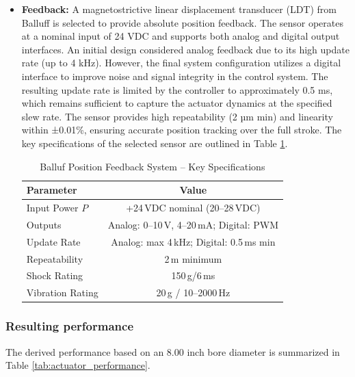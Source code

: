 \documentclass[
bindingoffset=5mm,  %
footnoteindent=3mm, %
hyphenation=true    %
]{src/wut-thesis}
\begin{document}
\begin{itemize}
		\item \textbf{Feedback:} A magnetostrictive linear displacement transducer (LDT) from Balluff is selected to provide absolute position feedback. The sensor operates at a nominal input of 24 VDC and supports both analog and digital output interfaces.
		An initial design considered analog feedback due to its high update rate (up to 4 kHz). However, the final system configuration utilizes a digital interface to improve noise and signal integrity in the control system. The resulting update rate is limited by the controller to approximately 0.5 ms, which remains sufficient to capture the actuator dynamics at the specified slew rate.
		The sensor provides high repeatability (2 µm min) and linearity within ±0.01\%, ensuring accurate position tracking over the full stroke. The key specifications of the selected sensor are outlined in Table \ref{tab:balluff_specs}.
		\begin{table}[htbp]
			\centering
			\begin{tabular}{l c}
				\toprule
				Parameter & Value \\
				\midrule
				Input Power $P$     & +24\,VDC nominal (20--28\,VDC) \\
				Outputs          & Analog: 0--10\,V, 4--20\,mA; Digital: PWM \\
				Update Rate      & Analog: max 4\,kHz; Digital: 0.5\,ms min \\
				Repeatability    & 2\,\textmu m minimum \\
				Shock Rating     & 150\,g/6\,ms  \\
				Vibration Rating & 20\,g / 10--2000\,Hz  \\
				\bottomrule
			\end{tabular}
			\caption{Balluf Position Feedback System -- Key Specifications}
			\label{tab:balluff_specs}
		\end{table}
		
	\end{itemize}
	
	\subsubsection{Resulting performance}
	
	The derived performance based on an 8.00 inch bore diameter is summarized in Table \ref{tab:actuator_performance}.
	
\end{document}
